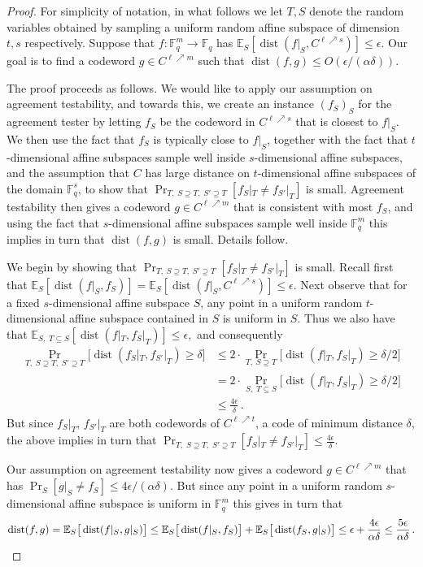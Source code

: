 \documentclass[11pt]{article}
\numberwithin{equation}{section}
\theoremstyle{definition}
\theoremstyle{plain}
\theoremstyle{plain}
\DeclareMathOperator{\dist}{dist} %
\newcommand{\E}{{\mathbb{E}}}
\newcommand{\F}{{\mathbb{F}}}
\begin{document}
\begin{proof}
For simplicity of notation, in what follows we let $T, S$ denote the random variables obtained by sampling a uniform random affine subspace of dimension $t, s$ respectively.
Suppose that $f:\F_q^m \to \F_q$ has $\E_{S}[\dist(f|_S, C^{\ell \nearrow s})] \leq \epsilon$.
Our goal is to find a codeword $g \in C^{\ell \nearrow m}$ such that
$\dist(f,g)\leq O(\epsilon / (\alpha \delta))$.

The proof proceeds as follows.
We would like to apply our assumption on agreement testability, and towards this, we create an instance $(f_S)_S$ for the agreement tester by letting $f_S$ be the codeword in $C^{\ell \nearrow s}$ that is closest to $f|_S$. We then use the fact that $f_S$ is typically close to $f|_S$, together with the
fact that $t$-dimensional affine subspaces sample well inside $s$-dimensional affine subspaces, and the assumption that $C$
has large distance  %
on $t$-dimensional affine subspaces
of the domain $\F_q^s$,   %
%
to show that  
$\Pr_{T,\;S\supseteq T, \; S' \supseteq T}[f_S|_T \neq f_{S'}|_T]$ is small.
 Agreement testability then gives a codeword $g \in C^{\ell \nearrow m}$ that is consistent with most $f_S$, and using the fact that $s$-dimensional affine subspaces sample well inside $\F_q^m$ this implies in turn that $\dist(f,g)$ is small. Details follow.


We begin by showing that
$\Pr_{T, \; S \supseteq T, \; S' \supseteq T}[f_S|_T \neq f_{ S'}|_T]$  is small.
Recall first that $\E_S[\dist(f|_S, f_S)] =  \E_{S}[\dist(f|_S, C^{\ell \nearrow s})]\leq  \epsilon$. Next observe that for a fixed $s$-dimensional affine subspace $S$, any point in a uniform random $t$-dimensional affine subspace contained in $S$ is uniform in $S$. Thus we also have that
$\E_{S,\; T \subseteq S}[\dist(f|_T, f_S|_T)] \leq \epsilon,$ and consequently
\begin{align*}
 \Pr_{T, \; S \supseteq T, \; S' \supseteq T}\big[\dist(f_S|_T, f_{ S'}|_T) \geq \delta\big]
& \leq  2 \cdot \Pr_{T,\; S \supseteq T}\big[\dist(f|_T, f_S|_T) \geq \delta/2\big] \\
& =  2 \cdot \Pr_{S,\; T \subseteq S}\big[\dist(f|_T, f_S|_T) \geq \delta/2\big] \\
& \leq  \frac{4\epsilon} {\delta}\,.
\end{align*}
But since $f_S|_T$, $f_{S'}|_T$ are both codewords of $C^{\ell \nearrow t}$, a code of %
minimum   %
distance $\delta$, the above implies in turn that $\Pr_{T, \; S \supseteq T, \; S' \supseteq T}[f_S|_T \neq f_{ S'}|_T] \leq \frac{4\epsilon} {\delta}.$

Our assumption on agreement testability now gives a codeword $g \in C^{\ell \nearrow m}$ that has $\Pr_S[g|_S \neq f_S] \leq 4\epsilon/(\alpha \delta).$ But since any point in a uniform random $s$-dimensional affine subspace is uniform in $\F_q^m$ this gives in turn that
\[\dist(f,g) =\E_S\big[\dist(f|_S, g|_S)\big] \leq
  \E_S\big[\dist(f|_S, f_S)\big] + \E_S\big[\dist(f_S, g|_S)\big] \leq
  \epsilon +\frac{4\epsilon} {\alpha \delta} \leq \frac {5 \epsilon}
  {\alpha \delta} \,. \qedhere \]

\end{proof}
\end{document}
